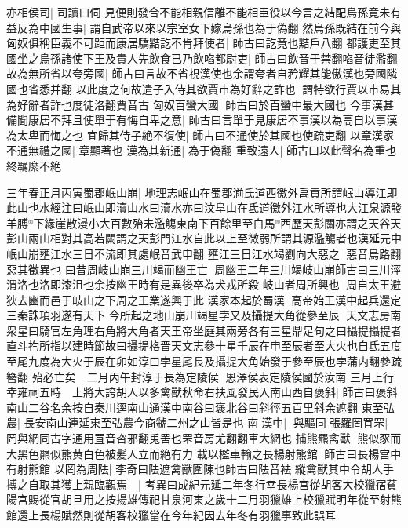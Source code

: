 亦相侯司|{
	司讀曰伺}
見便則發合不能相親信離不能相臣役以今言之結配烏孫竟未有益反為中國生事|{
	謂自武帝以來以宗室女下嫁烏孫也為于偽翻}
然烏孫既結在前今與匈奴俱稱臣義不可距而康居驕黠訖不肯拜使者|{
	師古曰訖竟也黠戶八翻}
都護吏至其國坐之烏孫諸使下王及貴人先飲食已乃飲啗都尉吏|{
	師古曰飲音于禁翻啗音徒濫翻}
故為無所省以夸旁國|{
	師古曰言故不省視漢使也余謂夸者自矜耀其能傲漢也旁國隣國也省悉并翻}
以此度之何故遣子入侍其欲賈市為好辭之詐也|{
	謂特欲行賈以市易其為好辭者詐也度徒洛翻賈音古}
匈奴百蠻大國|{
	師古曰於百蠻中最大國也}
今事漢甚備聞康居不拜且使單于有悔自卑之意|{
	師古曰言單于見康居不事漢以為高自以事漢為太卑而悔之也}
宜歸其侍子絶不復使|{
	師古曰不通使於其國也使疏吏翻}
以章漢家不通無禮之國|{
	章顯著也}
漢為其新通|{
	為于偽翻}
重致遠人|{
	師古曰以此聲名為重也}
終羈縻不絶

三年春正月丙寅蜀郡岷山崩|{
	地理志岷山在蜀郡湔氏道西徼外禹貢所謂岷山導江即此山也水經注曰岷山即瀆山水曰瀆水亦曰汶阜山在氐道徼外江水所導也大江泉源發羊膊下緣崖散漫小大百數殆未濫觴東南下百餘里至白馬西歷天彭關亦謂之天谷天彭山兩山相對其高若闕謂之天彭門江水自此以上至微弱所謂其源濫觴者也漢延元中岷山崩壅江水三日不流即其處岷音武申翻}
壅江三日江水竭劉向大惡之|{
	惡音烏路翻惡其徵異也}
曰昔周岐山崩三川竭而幽王亡|{
	周幽王二年三川竭岐山崩師古曰三川涇渭洛也洛即漆沮也余按幽王時有是異後卒為犬戎所殺}
岐山者周所興也|{
	周自太王避狄去豳而邑于岐山之下周之王業遂興于此}
漢家本起於蜀漢|{
	高帝始王漢中起兵還定三秦誅項羽遂有天下}
今所起之地山崩川竭星孛又及攝提大角從參至辰|{
	天文志房南衆星曰騎官左角理右角將大角者天王帝坐庭其兩旁各有三星鼎足句之曰攝提攝提者直斗扚所指以建時節故曰攝提格晋天文志參十星千辰在申至辰者至大火也自氐五度至尾九度為大火于辰在卯如淳曰孛星尾長及攝提大角始發于參至辰也孛蒲内翻參疏簪翻}
殆必亡矣　二月丙午封淳于長為定陵侯|{
	恩澤侯表定陵侯國於汝南}
三月上行幸雍祠五畤　上將大誇胡人以多禽獸秋命右扶風發民入南山西自褒斜|{
	師古曰褒斜南山二谷名余按自秦川逕南山通漢中南谷曰褒北谷曰斜徑五百里斜余遮翻}
東至弘農|{
	長安南山連延東至弘農今商虢二州之山皆是也}
南漢中|{
	與驅同}
張羅罔罝罘|{
	罔與網同古字通用罝音咨邪翻兎罟也罘音房尤翻翻車大網也}
捕熊羆禽獸|{
	熊似豕而大黑色羆似熊黄白色被髪人立而絶有力}
載以檻車輸之長楊射熊館|{
	師古曰長楊宫中有射熊館}
以罔為周阹|{
	李奇曰阹遮禽獸圍陳也師古曰阹音袪}
縱禽獸其中令胡人手搏之自取其獲上親臨觀焉　|{
	考異曰成紀元延二年冬行幸長楊宫從胡客大校獵宿萯陽宫賜從官胡旦用之按揚雄傳祀甘泉河東之歲十二月羽獵雄上校獵賦明年從至射熊館還上長楊賦然則從胡客校獵當在今年紀因去年冬有羽獵事致此誤耳}



